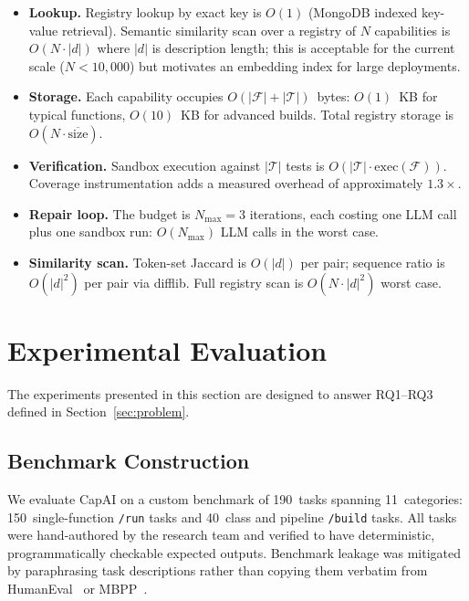 \documentclass[conference]{IEEEtran}
\begin{document}
\begin{itemize}
  \item \textbf{Lookup.} Registry lookup by exact key is $O(1)$ (MongoDB
        indexed key-value retrieval). Semantic similarity scan over a
        registry of $N$ capabilities is $O(N \cdot |d|)$ where $|d|$ is
        description length; this is acceptable for the current scale
        ($N < 10{,}000$) but motivates an embedding index for large
        deployments.

  \item \textbf{Storage.} Each capability occupies
        $O(|\mathcal{F}| + |\mathcal{T}|)$~bytes: $O(1)$~KB for typical
        functions, $O(10)$~KB for advanced builds. Total registry storage
        is $O(N \cdot \overline{\text{size}})$.

  \item \textbf{Verification.} Sandbox execution against $|\mathcal{T}|$
        tests is $O(|\mathcal{T}| \cdot \text{exec}(\mathcal{F}))$.
        Coverage instrumentation adds a measured overhead of approximately
        $1.3\times$.

  \item \textbf{Repair loop.} The budget is $N_{\max} = 3$ iterations,
        each costing one LLM call plus one sandbox run: $O(N_{\max})$ LLM
        calls in the worst case.

  \item \textbf{Similarity scan.} Token-set Jaccard is $O(|d|)$ per pair;
        sequence ratio is $O(|d|^2)$ per pair via difflib. Full registry
        scan is $O(N \cdot |d|^2)$ worst case.
\end{itemize}

\section{Experimental Evaluation}
\label{sec:evaluation}

The experiments presented in this section are designed to answer RQ1--RQ3
defined in Section~\ref{sec:problem}.

\subsection{Benchmark Construction}
\label{subsec:benchmark_construction}

We evaluate CapAI on a custom benchmark of 190~tasks spanning 11~categories:
150~single-function \texttt{/run} tasks and 40~class and pipeline
\texttt{/build} tasks.
All tasks were hand-authored by the research team and verified to have
deterministic, programmatically checkable expected outputs.
Benchmark leakage was mitigated by paraphrasing task descriptions rather
than copying them verbatim from HumanEval~\cite{chen2021humaneval} or
MBPP~\cite{austin2021mbpp}.
\end{document}
